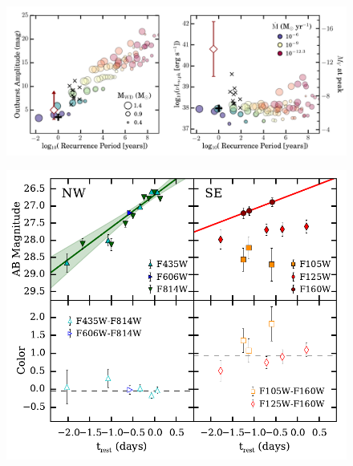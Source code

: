 \begin{supplementary}
\begin{figure}[tbp]
  \begin{center}
    \includegraphics[width=\textwidth]{recurrent_nova_recurrence_comparison}
    \caption{\protect}
  \end{center}
\end{figure}

\begin{figure}[tbp]
  \begin{center}
    \includegraphics[width=\textwidth]{spock_colorcurves_observerframe}
    \caption{\protect}
  \end{center}
\end{figure}


\end{supplementary}
